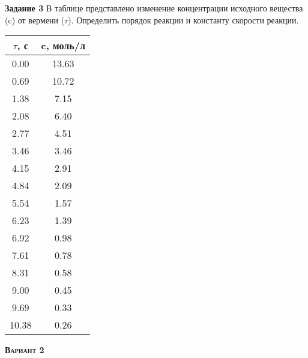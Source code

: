 \textbf{Задание 3} В таблице представлено изменение концентрации исходного вещества (c) от вермени ($\tau$). Определить порядок реакции и константу скорости реакции.

\begin{table}[h]
\begin{tabular}{|c|c|}
\hline
$\tau$, с & c, моль/л \\ \hline
 0.00 &      13.63 \\ \hline 
 0.69 &      10.72 \\ \hline 
 1.38 &       7.15 \\ \hline 
 2.08 &       6.40 \\ \hline 
 2.77 &       4.51 \\ \hline 
 3.46 &       3.46 \\ \hline 
 4.15 &       2.91 \\ \hline 
 4.84 &       2.09 \\ \hline 
 5.54 &       1.57 \\ \hline 
 6.23 &       1.39 \\ \hline 
 6.92 &       0.98 \\ \hline 
 7.61 &       0.78 \\ \hline 
 8.31 &       0.58 \\ \hline 
 9.00 &       0.45 \\ \hline 
 9.69 &       0.33 \\ \hline 
10.38 &       0.26 \\ \hline 
\end{tabular}
\end{table}

\newpage

\textsc{\textbf{Вариант 2}}

